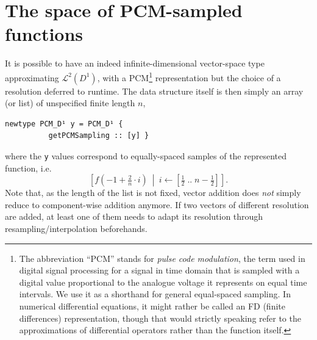 \documentclass[sigplan,review,anonymous]{acmart}\settopmatter{printfolios=true,printccs=false,printacmref=false}
\theoremstyle{acmplain}
\theoremstyle{acmdefinition}
\begin{document}
\section{The space of PCM-sampled functions}
It is possible to have an indeed infinite-dimensional vector-space type approximating $\mathcal{L}^2(D^1)$, with a PCM\footnote{%
The abbreviation “PCM” stands for \emph{pulse code modulation}, the term used in digital signal processing for a signal in time domain that is sampled with a digital value proportional to the analogue voltage it represents on equal time intervals. We use it as a shorthand for general equal-spaced sampling. In numerical differential equations, it might rather be called an FD (finite differences) representation, though that would strictly speaking refer to the approximations of differential operators rather than the function itself.
} representation but the choice of a resolution deferred to runtime. The data structure itself is then simply an array (or list) of unspecified finite length $n$,
\begin{lstlisting}
newtype PCM_D¹ y = PCM_D¹ {
          getPCMSampling :: [y] }
\end{lstlisting}
where the \lstinline`y` values correspond to equally-spaced samples of the represented function, i.e.
\[
  \left[f(-1 + \tfrac2n\cdot i)\ \middle|\ i\leftarrow[\tfrac12\;..\;n-\tfrac12]\right].
\]
Note that, as the length of the list is not fixed,
vector addition does \emph{not} simply reduce to component-wise addition anymore. If two vectors of different resolution are added, at least one of them needs to adapt its resolution through resampling/interpolation beforehands.
\end{document}
